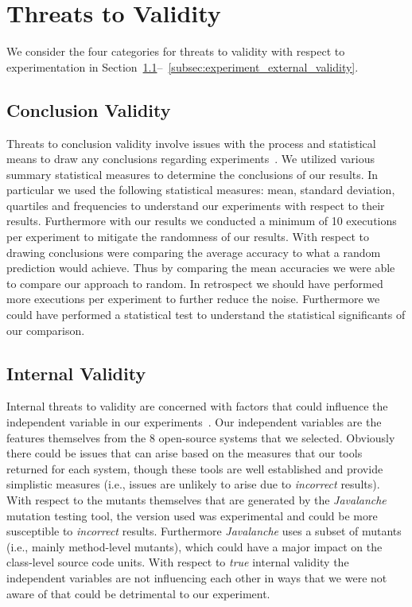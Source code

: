 \section{Threats to Validity}
\label{sec:experiment_threats}
We consider the four categories for threats to validity with respect to experimentation in Section~\ref{subsec:experiment_conclusion_validity}--~\ref{subsec:experiment_external_validity}.


\subsection{Conclusion Validity}
\label{subsec:experiment_conclusion_validity}
Threats to conclusion validity involve issues with the process and statistical means to draw any conclusions regarding experiments~\cite{WRH+00,WKP10}. We utilized various summary statistical measures to determine the conclusions of our results. In particular we used the following statistical measures: mean, standard deviation, quartiles and frequencies to understand our experiments with respect to their results. Furthermore with our results we conducted a minimum of 10 executions per experiment to mitigate the randomness of our results. With respect to drawing conclusions were comparing the average accuracy to what a random prediction would achieve. Thus by comparing the mean accuracies we were able to compare our approach to random. In retrospect we should have performed more executions per experiment to further reduce the noise. Furthermore we could have performed a statistical test to understand the statistical significants of our comparison.


\subsection{Internal Validity}
\label{subsec:experiment_internal_validity}
Internal threats to validity are concerned with factors that could influence the independent variable in our experiments~\cite{WRH+00,WKP10}. Our independent variables are the features themselves from the 8 open-source systems that we selected. Obviously there could be issues that can arise based on the measures that our tools returned for each system, though these tools are well established and provide simplistic measures (i.e., issues are unlikely to arise due to \emph{incorrect} results). With respect to the mutants themselves that are generated by the \emph{Javalanche} mutation testing tool, the version used was experimental and could be more susceptible to \emph{incorrect} results. Furthermore \emph{Javalanche} uses a subset of mutants (i.e., mainly method-level mutants), which could have a major impact on the class-level source code units. With respect to \emph{true} internal validity the independent variables are not influencing each other in ways that we were not aware of that could be detrimental to our experiment.


